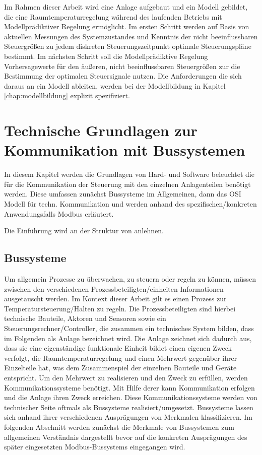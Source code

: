 Im Rahmen dieser Arbeit wird eine Anlage aufgebaut und ein Modell gebildet, die eine Raumtemperaturregelung während des laufenden Betriebs mit Modellprädiktiver Regelung ermöglicht. Im ersten Schritt werden auf Basis von aktuellen Messungen des Systemzustandes und Kenntnis der nicht beeinflussbaren Steuergrößen zu jedem diskreten Steuerungszeitpunkt optimale Steuerungspläne bestimmt. Im nächsten Schritt soll die Modellprädiktive Regelung Vorhersagewerte für den äußeren, nicht beeinflussbaren Steuergrößen zur die Bestimmung der optimalen Steuersignale nutzen.
Die Anforderungen die sich daraus an ein Modell ableiten, werden bei der Modellbildung in Kapitel \ref{chap:modellbildung} explizit spezifiziert.

\section{Technische Grundlagen zur Kommunikation mit Bussystemen}
\label{sec:grundlagenbus}
In diesem Kapitel werden die Grundlagen von Hard- und Software beleuchtet die für die Kommunikation der Steuerung mit den einzelnen Anlagenteilen benötigt werden.
Diese umfassen zunächst Bussysteme im Allgemeinen, dann das OSI Modell für techn. Kommunikation und werden anhand des spezifischen/konkreten Anwendungsfalls Modbus erläutert.

Die Einführung wird an der Struktur von \cite{schn06} anlehnen.

\subsection{Bussysteme} 
Um allgemein Prozesse zu überwachen, zu steuern oder regeln zu können, müssen zwischen den verschiedenen Prozessbeteiligten/einheiten Informationen ausgetauscht werden. Im Kontext dieser Arbeit gilt es einen Prozess zur Temperatursteuerung/Halten zu regeln. Die Prozessbeteiligten sind hierbei technische Bauteile, Aktoren und Sensoren sowie ein Steuerungsrechner/Controller, die zusammen ein technisches System bilden, dass im Folgenden als Anlage bezeichnet wird. Die Anlage zeichnet sich dadurch aus, dass sie eine eigenständige funktionale Einheit bildet einen eigenen Zweck verfolgt, die Raumtemperaturregelung und einen Mehrwert gegenüber ihrer Einzelteile hat, was dem Zusammenspiel der einzelnen Bauteile und Geräte entspricht. 
Um den Mehrwert zu realisieren und den Zweck zu erfüllen, werden Kommunikationssysteme benötigt. Mit Hilfe derer kann Kommunikation erfolgen und die Anlage ihren Zweck erreichen.
Diese Kommunikationssysteme werden von technischer Seite oftmals als Bussysteme realisiert/umgesetzt.
Bussysteme lassen sich anhand ihrer verschiedenen Ausprägungen von Merkmalen klassifizieren. Im folgenden Abschnitt werden zunächst die Merkmale von Bussystemen zum allgemeinen Verständnis dargestellt bevor auf die konkreten Ausprägungen des später eingesetzten Modbus-Bussystems eingegangen wird.

